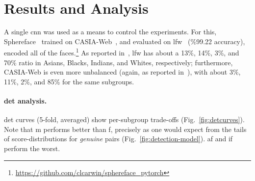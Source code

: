 
\section{Results and Analysis}
A single \gls{cnn} was used as a means to control the experiments. For this, Sphereface~\cite{liu2017sphereface} trained on CASIA-Web~\cite{yi2014learning}, and evaluated on \gls{lfw}~\cite{LFWTech} (\%99.22 accuracy), encoded all of the faces.\footnote{\href{$https://github.com/clcarwin/sphereface\_pytorch$}{https://github.com/clcarwin/sphereface\_pytorch}} As reported in~\cite{wang2019racial}, \gls{lfw} has about a 13\%, 14\%, 3\%, and 70\% ratio in Asians, Blacks, Indians, and Whites, respectively; furthermore, CASIA-Web is even more unbalanced (again, as reported in~\cite{wang2019racial}), with about  3\%, 11\%, 2\%, and 85\% for the same subgroups.
\noindent\paragraph{\gls{det} analysis.}
\gls{det} curves (5-fold, averaged) show per-subgroup trade-offs (Fig.~\ref{fig:detcurves}). Note that \gls{m} performs better than \gls{f}, precisely as one would expect from the tails of score-distributions for \emph{genuine} pairs (Fig.~\ref{fig:detection-model}). \Gls{af} and \gls{if} perform the worst.


